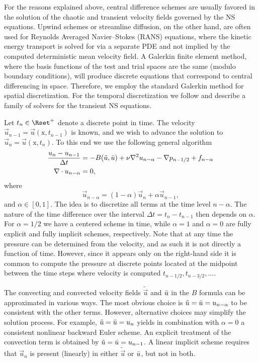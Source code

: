 For the reasons explained above, central difference schemes are usually
favored in the solution of the chaotic and transient velocity fields
governed by the NS equations. Upwind schemes or streamline diffusion,
on the other hand, are often used for Reynolds Averaged Navier--Stokes
(RANS) equations, where the kinetic energy transport is solved for
via a separate PDE and not implied by the computed deterministic mean
velocity field. A Galerkin finite element method, where the basis
functions of the test and trial spaces are the same (modulo boundary
conditions), will produce discrete equations that correspond to central
differencing in space. Therefore, we employ the standard Galerkin method
for spatial discretization. For the temporal discretization we follow
\citet{SimoArmero1994} and describe a family of solvers for the transient
NS equations.

Let $t_n \in \Rset^{+}$ denote a discrete point in time. The velocity
$\vec{u}_{n-1}=\vec{u}(\text{x},t_{n-1})$ is known, and we wish to advance
the solution to $\vec{u}_{n}=\vec{u}(\text{x},t_{n})$.  To this end we
use the following general algorithm
\begin{align}
\label{eq:mortensen:NS_d}
    \frac{\vec{u}_{n}-\vec{u}_{n-1}}{\Delta t}
      &= - B(\tilde{\vec{u}},\Bar{\vec{u}})
          + \nu \nabla^2 \vec{u}_{n-\alpha}
        -\nabla p_{n-1/2} + f_{n-\alpha}
\\
 \label{eq:mortensen:cont_d}
    \nabla \cdot \vec{u}_{n-\alpha} &= 0,
\end{align}
where
\begin{equation}
   \vec{u}_{n-\alpha}=(1-\alpha) \vec{u}_{n} + \alpha \vec{u}_{n-1},
\end{equation}
and $\alpha \in [0, 1]$.  The idea is to discretize all terms at the
time level $n-\alpha$. The nature of the time difference over the interval
$\Delta t = t_n - t_{n-1}$ then depends on $\alpha$. For $\alpha =1/2$
we have a centered scheme
in time, while $\alpha =1$ and $\alpha=0$ are fully explicit and fully
implicit schemes, respectively. Note that at any time the pressure can be
determined from the velocity, and as such it is not directly a function
of time. However, since it appears only on the right-hand side it is
common to compute the pressure at discrete points located at the
midpoint between the time steps where velocity is computed
$t_{n-1/2}, t_{n-3/2}, \ldots$.

The convecting and convected velocity fields
$\tilde{\vec{u}}$ and $\Bar{\vec{u}}$ in the $B$ formula can
be approximated in various ways. The most obvious choice is
$\tilde{\vec{u}}=\Bar{\vec{u}}=\vec{u}_{n-\alpha}$ to be consistent with
the other terms. However, alternative choices may simplify the solution
process. For example, $\tilde{\vec{u}}=\Bar{\vec{u}}=\vec{u}_{n}$ yields
in combination with $\alpha=0$ a consistent nonlinear backward Euler
scheme. An explicit treatment of the convection term is obtained by
$\tilde{\vec{u}} = \Bar{\vec{u}} = \vec{u}_{n-1}$.  A linear implicit
scheme requires that $\vec{u}_{n}$ is present (linearly) in either
$\tilde{\vec{u}}$ or $\Bar{\vec{u}}$, but not in both.

